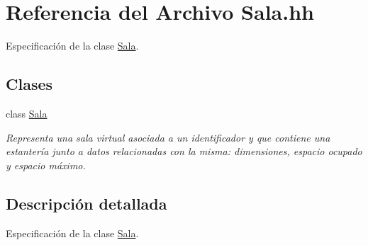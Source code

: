 \hypertarget{_sala_8hh}{}\section{Referencia del Archivo Sala.\+hh}
\label{_sala_8hh}


Especificación de la clase \hyperlink{class_sala}{Sala}.  


\subsection*{Clases}
\begin{DoxyCompactItemize}
\item 
class \hyperlink{class_sala}{Sala}
\begin{DoxyCompactList}\small\item\em Representa una sala virtual asociada a un identificador y que contiene una estantería junto a datos relacionadas con la misma\+: dimensiones, espacio ocupado y espacio máximo. \end{DoxyCompactList}\end{DoxyCompactItemize}


\subsection{Descripción detallada}
Especificación de la clase \hyperlink{class_sala}{Sala}. 

